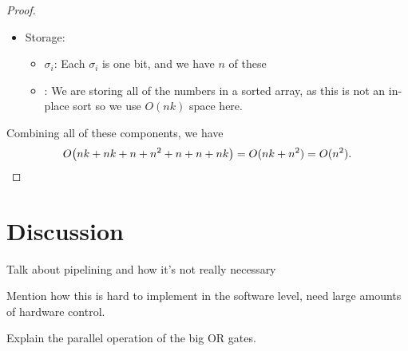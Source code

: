\documentclass{article}
\begin{document}
\begin{proof}
\begin{itemize}
    \item Storage:
    \begin{itemize}
      \item $\sigma_i$: Each $\sigma_i$ is one bit, and we have $n$ of these
      \item {}: We are storing all of the numbers in a sorted array, as this is not an in-place sort so we use $O(nk)$ space here.
    \end{itemize}
  \end{itemize}

  Combining all of these components, we have 
  \begin{equation}
    O\pa{
      nk + nk + n + n^2 + n + n + nk
    } = O(nk + n^2) = O(n^2).
  \end{equation}
\end{proof}

\section{Discussion}

Talk about pipelining and how it's not really necessary

Mention how this is hard to implement in the software level, need large amounts of hardware control.




\appendix

Explain the parallel operation of the big OR gates.
\end{document}

